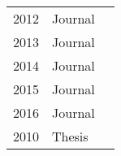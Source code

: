 \begin{table}[]
\begin{tabular}{lll}
2012          & Journal          & \cite{Yan2012}\cite{Grechanik2012}\cite{Vasar2012}                                  \\
2013          & Journal          & \cite{Malik2013a}\cite{Wang2013}\cite{Wert2013a}\cite{Talbi2013}\cite{Barna2013}                    \\
2014          & Journal          & \cite{Wert2014}                                                                     \\
2015          & Journal          & \cite{Jiang2015}\cite{Luo2015}                                                      \\
2016          & Journal          & \cite{Vogele2016}                                                                  \\
2010          & Thesis           & \cite{Jiang2010}                                                                   
\end{tabular}
\end{table}


